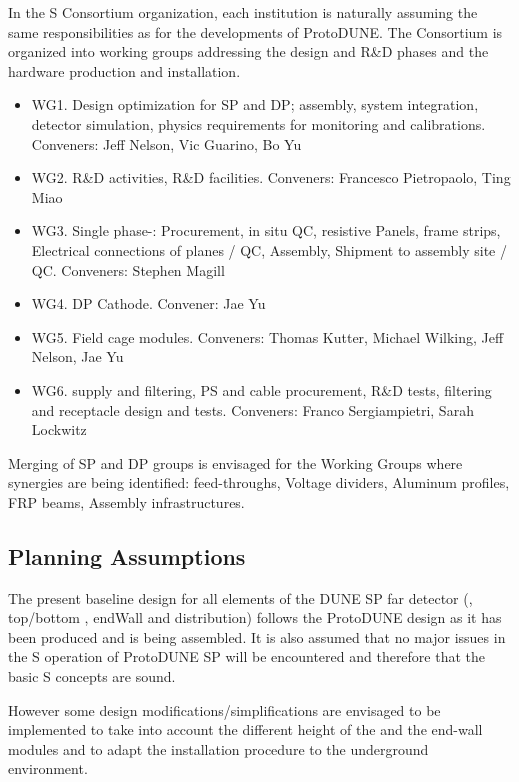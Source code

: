 In the S Consortium organization, each institution is naturally assuming the same responsibilities as for the developments of ProtoDUNE. The Consortium is organized into working groups addressing the design and  R\&D phases and the hardware production and installation.

\begin{itemize}
\item WG1. Design optimization for SP and DP; assembly, system integration, detector simulation, physics requirements for monitoring and calibrations. Conveners: Jeff Nelson, Vic Guarino, Bo Yu
\item WG2. R\&D activities, R\&D facilities. Conveners: Francesco Pietropaolo, Ting Miao
\item WG3. Single phase-: Procurement, in situ QC, resistive Panels, frame strips, Electrical connections of planes / QC, Assembly, Shipment to assembly site / QC. Conveners: Stephen Magill
\item WG4. DP Cathode. Convener: Jae Yu
\item WG5. Field cage modules. Conveners: Thomas Kutter, Michael Wilking, Jeff Nelson, Jae Yu
\item WG6.  supply and filtering,  PS and cable procurement, R\&D tests, filtering and receptacle design and tests. Conveners: Franco Sergiampietri, Sarah Lockwitz
\end{itemize}

\noindent Merging of SP and DP groups is envisaged for the Working Groups where synergies are being identified:  feed-throughs, Voltage dividers, Aluminum profiles, FRP beams, Assembly infrastructures.

\subsection{Planning Assumptions}
\label{sec:fdsp-hv-org-assmp}
The present baseline design for all elements of the DUNE SP far detector (, top/bottom , endWall  and  distribution) follows the ProtoDUNE design as it has been produced and is being assembled.  It is also assumed that no major issues in the S operation of ProtoDUNE SP will be encountered and therefore that the basic S concepts are sound.

However some design modifications/simplifications are envisaged to be implemented to take into account the different height of the   and the end-wall modules and to adapt the installation procedure to the underground environment.

